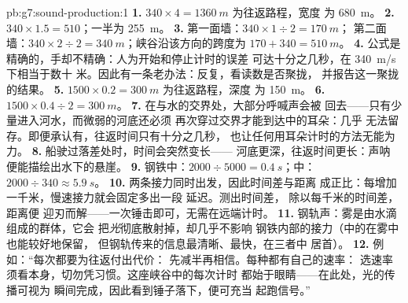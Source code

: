 \begin{solution}{pb:g7:sound-production:1}
\textbf{1.} $340 \times 4 = \qty{1360}{m}$ 为往返路程，宽度
为 \qty{680}{m}。
\textbf{2.} $340 \times 1.5 = 510$；一半为 \qty{255}{m}。
\textbf{3.} 第一面墙：$340 \times 1 \div 2 = \qty{170}{m}$；
第二面墙：$340 \times 2 \div 2 = \qty{340}{m}$；峡谷沿该方向的跨度为
$170 + 340 = \qty{510}{m}$。
\textbf{4.} 公式是精确的，手却不精确：人为开始和停止计时的误差
可达十分之几秒，在 \qty{340}{m/s} 下相当于数十
米。因此有一条老办法：反复，看读数是否聚拢，
并报告这一聚拢的结果。
\textbf{5.} $1500 \times 0.2 = \qty{300}{m}$ 为往返路程，深度
为 \qty{150}{m}。
\textbf{6.} $1500 \times 0.4 \div 2 = \qty{300}{m}$。
\textbf{7.} 在与水的交界处，大部分呼喊声会被
回去——只有少量进入河水，而微弱的河底还必须
再次穿过交界才能到达中的耳朵：几乎
无法留存。即便承认有，往返时间只有十分之几秒，
也让任何用耳朵计时的方法无能为力。
\textbf{8.} 船驶过落差处时，时间会突然变长——
河底更深，往返时间更长：声呐
便能描绘出水下的悬崖。
\textbf{9.} 钢铁中：$2000 \div 5000 = \qty{0.4}{s}$；中：$2000
\div 340 \approx \qty{5.9}{s}$。
\textbf{10.} 两条接力同时出发，因此时间差与距离
成正比：每增加一千米，慢速接力就会固定多出一段
延迟。测出时间差，
除以每千米的时间差，距离便
迎刃而解——一次锤击即可，无需在远端计时。
\textbf{11.} 钢轨声：雾是由水滴组成的群体，它会
把\emph{光}彻底散射掉，却几乎不影响
钢铁内部的接力（中的在雾中也能较好地保留，
但钢轨传来的信息最清晰、最快，在三者中
居首）。
\textbf{12.} 例如：“每次都要为往返付出代价：
先减半再相信。每种都有自己的速率：
选速率须看本身，切勿凭习惯。这座峡谷中的每次计时
都始于眼睛——在此处，光的传播可视为
瞬间完成，因此看到锤子落下，便可充当
起跑信号。”
\end{solution}
